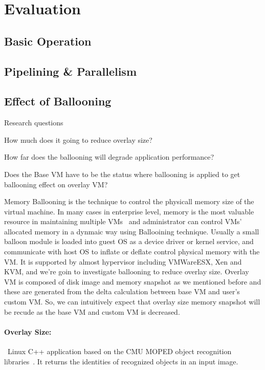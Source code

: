 \section{Evaluation}
\label{sec:evaluation}

\subsection{Basic Operation}
\label{sec:basic_operation}


\subsection{Pipelining \& Parallelism}
\label{sec:pipelining}


\subsection{Effect of Ballooning}
\label{sec:ballooining}

Research questions
\begin{smitemize}
\item{How much does it going to reduce overlay size?}
\item{How far does the ballooning will degrade application performance?}
\item{Does the Base VM have to be the status where ballooning is 
applied to get ballooning effect on overlay VM?}
\end{smitemize}
Memory Ballooning is the technique to control the physicall memory size of the
virtual machine. In many cases in enterprise level, memory is the most valuable 
resource in maintaining multiple VMs~\cite{} and administrator can control
VMs' allocated memory in a dynmaic way using Ballooining technique.
Usually a small balloon module is loaded into guest OS as a device driver
or kernel service, and communicate with host OS to inflate or deflate control
physical memory with the VM. It is supported by almost hypervisor including
VMWareESX, Xen and KVM, and we're goin to investigate ballooning to reduce
overlay size. Overlay VM is composed of disk image and memory snapshot as
we mentioned before and these are generated from the delta calculation between
base VM and user's custom VM. So, we can intuitively expect that overlay
size memory snapshot will be recude as the base VM and custom VM is decreased.

\paragraph{Overlay Size:}~Linux C++ application based
on the CMU MOPED object recognition libraries~\cite{MOPED2011}. 
It returns the identities of recognized objects in an input image.


